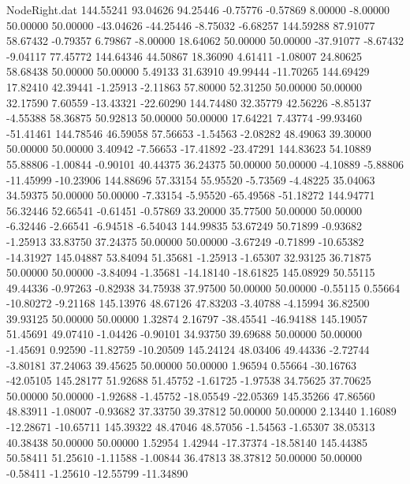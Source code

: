 \begin{filecontents}{NodeRight.dat}
 144.55241   93.04626   94.25446    -0.75776   -0.57869    8.00000   -8.00000   50.00000   50.00000  -43.04626  -44.25446   -8.75032   -6.68257
 144.59288   87.91077   58.67432    -0.79357    6.79867   -8.00000   18.64062   50.00000   50.00000  -37.91077   -8.67432   -9.04117   77.45772
 144.64346   44.50867   18.36090     4.61411   -1.08007   24.80625   58.68438   50.00000   50.00000    5.49133   31.63910   49.99444  -11.70265
 144.69429   17.82410   42.39441    -1.25913   -2.11863   57.80000   52.31250   50.00000   50.00000   32.17590    7.60559  -13.43321  -22.60290
 144.74480   32.35779   42.56226    -8.85137   -4.55388   58.36875   50.92813   50.00000   50.00000   17.64221    7.43774  -99.93460  -51.41461
 144.78546   46.59058   57.56653    -1.54563   -2.08282   48.49063   39.30000   50.00000   50.00000    3.40942   -7.56653  -17.41892  -23.47291
 144.83623   54.10889   55.88806    -1.00844   -0.90101   40.44375   36.24375   50.00000   50.00000   -4.10889   -5.88806  -11.45999  -10.23906
 144.88696   57.33154   55.95520    -5.73569   -4.48225   35.04063   34.59375   50.00000   50.00000   -7.33154   -5.95520  -65.49568  -51.18272
 144.94771   56.32446   52.66541    -0.61451   -0.57869   33.20000   35.77500   50.00000   50.00000   -6.32446   -2.66541   -6.94518   -6.54043
 144.99835   53.67249   50.71899    -0.93682   -1.25913   33.83750   37.24375   50.00000   50.00000   -3.67249   -0.71899  -10.65382  -14.31927
 145.04887   53.84094   51.35681    -1.25913   -1.65307   32.93125   36.71875   50.00000   50.00000   -3.84094   -1.35681  -14.18140  -18.61825
 145.08929   50.55115   49.44336    -0.97263   -0.82938   34.75938   37.97500   50.00000   50.00000   -0.55115    0.55664  -10.80272   -9.21168
 145.13976   48.67126   47.83203    -3.40788   -4.15994   36.82500   39.93125   50.00000   50.00000    1.32874    2.16797  -38.45541  -46.94188
 145.19057   51.45691   49.07410    -1.04426   -0.90101   34.93750   39.69688   50.00000   50.00000   -1.45691    0.92590  -11.82759  -10.20509
 145.24124   48.03406   49.44336    -2.72744   -3.80181   37.24063   39.45625   50.00000   50.00000    1.96594    0.55664  -30.16763  -42.05105
 145.28177   51.92688   51.45752    -1.61725   -1.97538   34.75625   37.70625   50.00000   50.00000   -1.92688   -1.45752  -18.05549  -22.05369
 145.35266   47.86560   48.83911    -1.08007   -0.93682   37.33750   39.37812   50.00000   50.00000    2.13440    1.16089  -12.28671  -10.65711
 145.39322   48.47046   48.57056    -1.54563   -1.65307   38.05313   40.38438   50.00000   50.00000    1.52954    1.42944  -17.37374  -18.58140
 145.44385   50.58411   51.25610    -1.11588   -1.00844   36.47813   38.37812   50.00000   50.00000   -0.58411   -1.25610  -12.55799  -11.34890

\end{filecontents}
